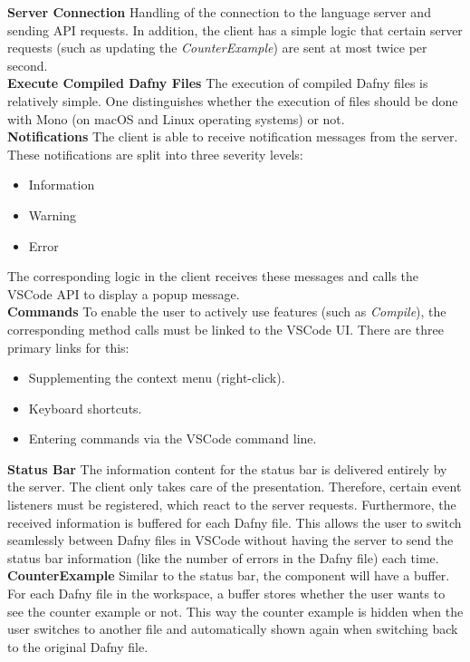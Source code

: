 {\bf Server Connection} \textendash{}
Handling of the connection to the language server and sending API requests.
In addition, the client has a simple logic that certain server requests (such as updating the \textit{CounterExample})
are sent at most twice per second. \\

{\bf Execute Compiled Dafny Files} \textendash{}
The execution of compiled Dafny files is relatively simple.
One distinguishes whether the execution of  files should be done with Mono (on macOS and Linux operating systems) or not. \\

{\bf Notifications} \textendash{}
The client is able to receive notification messages from the server.
These notifications are split into three severity levels:
\begin{itemize}
    \item Information
    \item Warning
    \item Error
\end{itemize}
The corresponding logic in the client receives these messages and calls the VSCode API to display a popup message. \\

{\bf Commands} \textendash{}
To enable the user to actively use features (such as \textit{Compile}),
the corresponding method calls must be linked to the VSCode UI.
There are three primary links for this:
\begin{itemize}
    \item Supplementing the context menu (right-click).
    \item Keyboard shortcuts.
    \item Entering commands via the VSCode command line.
\end{itemize}

{\bf Status Bar} \textendash{}
The information content for the status bar is delivered entirely by the server.
The client only takes care of the presentation.
Therefore, certain event listeners must be registered, which react to the server requests.
Furthermore, the received information is buffered for each Dafny file.
This allows the user to switch seamlessly between Dafny files in VSCode
without having the server to send the status bar information
(like the number of errors in the Dafny file) each time.\\

{\bf CounterExample} \textendash{}
Similar to the status bar, the  component will have a buffer.
For each Dafny file in the workspace, a buffer stores whether the user wants to see the counter example or not.
This way the counter example is hidden when the user switches to another file
and automatically shown again when switching back to the original Dafny file.

